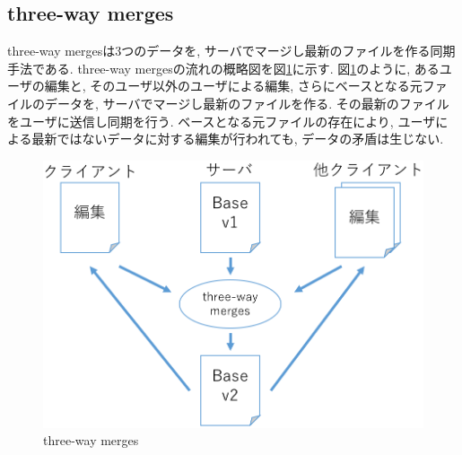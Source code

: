 \subsection{three-way merges}
three-way mergesは3つのデータを, サーバでマージし最新のファイルを作る同期手法である. three-way mergesの流れの概略図を図\ref{threeway}に示す. 図\ref{threeway}のように, あるユーザの編集と, そのユーザ以外のユーザによる編集, さらにベースとなる元ファイルのデータを, サーバでマージし最新のファイルを作る. その最新のファイルをユーザに送信し同期を行う. ベースとなる元ファイルの存在により, ユーザによる最新ではないデータに対する編集が行われても, データの矛盾は生じない.
\begin{figure}[htbp]
  \begin{center}
    \includegraphics[scale=0.5]{images/threeway}
    \caption{three-way merges}
    \label{threeway}
  \end{center}
\end{figure}
%
